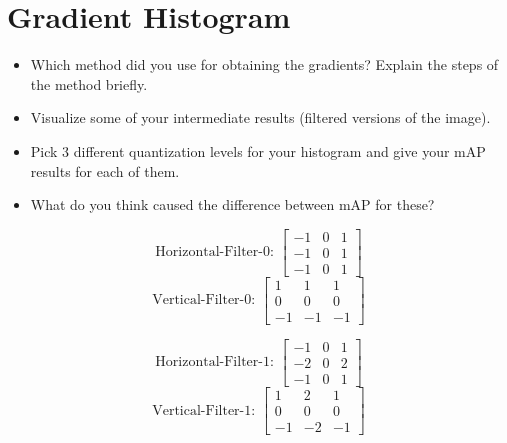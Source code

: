 \documentclass[12pt]{article}
\begin{document}
\section{Gradient Histogram}

\begin{itemize}
\item Which method did you use for obtaining the gradients? Explain the steps of the method briefly.
\item Visualize some of your intermediate results (filtered versions of the image).
\item Pick 3 different quantization levels for your histogram and give your mAP results for each of them.
\item What do you think caused the difference between mAP for these?
\end{itemize}



\begin{minipage}{\textwidth}
	\begin{minipage}{0.49\textwidth}
	\[\text{Horizontal-Filter-0: }
	\begin{bmatrix}
	    -1 & 0 & 1 \\
	    -1 & 0 & 1 \\
	    -1 & 0 & 1
	\end{bmatrix}
	\]
	\linebreak
	\[
	\text{Vertical-Filter-0: }
	\begin{bmatrix}
	    1 & 1 & 1 \\
	    0 & 0 & 0 \\
	    -1 & -1 & -1
	\end{bmatrix}
	\]
	\end{minipage}
	\begin{minipage}{0.25\textwidth}
	\[\text{Horizontal-Filter-1: }
	\begin{bmatrix}
	    -1 & 0 & 1 \\
	    -2 & 0 & 2 \\
	    -1 & 0 & 1
	\end{bmatrix}
	\]
	\linebreak
	\[
	\text{Vertical-Filter-1: }
	\begin{bmatrix}
	    1 & 2 & 1 \\
	    0 & 0 & 0 \\
	    -1 & -2 & -1
	\end{bmatrix}
	\]
	\end{minipage}
\end{minipage}
\end{document}
